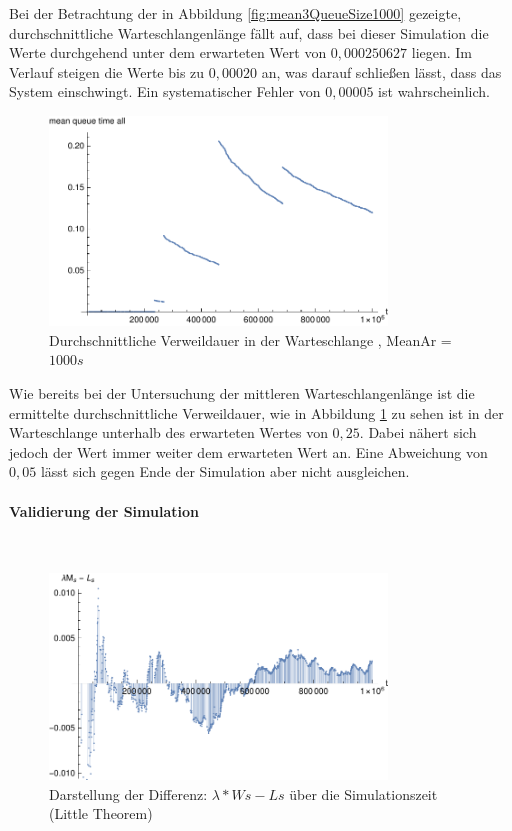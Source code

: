 Bei der Betrachtung der in Abbildung \ref{fig:mean3QueueSize1000} gezeigte, durchschnittliche Warteschlangenlänge fällt auf, dass bei dieser Simulation die Werte durchgehend unter dem erwarteten Wert von $0,000250627$ liegen. Im Verlauf steigen die Werte bis zu $0,00020$ an, was darauf schließen lässt, dass das System einschwingt. Ein systematischer Fehler von $0,00005$ ist wahrscheinlich.

\begin{figure}[htpb]
	\centering
	\includegraphics[width=0.8\textwidth]{abbildungen/2_Phone_VIP/Arrival_1000_Serve_100_dur_1000000_Skip_0/MeanQueueTimeAll.pdf}
	\caption{Durchschnittliche Verweildauer in der Warteschlange , MeanAr = $1000s$}
	\label{fig:mean3QueueTime1000}
\end{figure}

Wie bereits bei der Untersuchung der mittleren Warteschlangenlänge ist die ermittelte durchschnittliche Verweildauer, wie in Abbildung \ref{fig:mean3QueueTime1000} zu sehen ist in der Warteschlange unterhalb des erwarteten Wertes von $0,25$. Dabei nähert sich jedoch der Wert immer weiter dem erwarteten Wert an. Eine Abweichung von $0,05$ lässt sich gegen Ende der Simulation aber nicht ausgleichen.

\paragraph{Validierung der Simulation}
\\
\begin{figure}[htpb]
	\centering
	\includegraphics[width=0.8\textwidth]{abbildungen/2_Phone_VIP/Arrival_1000_Serve_100_dur_1000000_Skip_0/LittleSystem.pdf}
	\caption{Darstellung der Differenz: $\lambda * Ws - Ls$ über die Simulationszeit (Little Theorem)}
	\label{fig:Little3System1000}
\end{figure}

